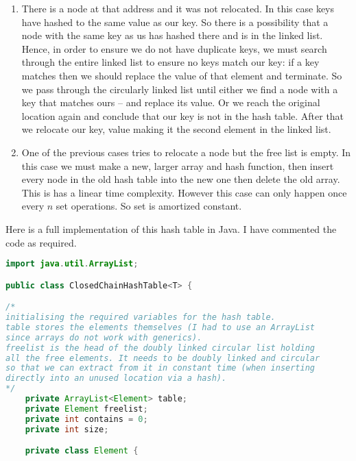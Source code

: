 \documentclass[10pt,\jkfside,a4paper]{article}
\begin{document}
\begin{enumerate}
\begin{enumerate}
\begin{enumerate}[label=(\arabic*)]
\item There is a node at that address and it was not relocated. In this case keys have hashed to the same value as 
our key. So there is a possibility that a node with the same key as us has hashed there and is in the linked list. 
Hence, in order to ensure we do not have duplicate keys, we must search through the entire linked list to ensure no keys match our 
key: if a key matches then we should replace the value of that element and terminate. So we pass through the circularly linked list 
until either we find a node with a key that matches ours -- and replace its value. Or we reach the original location again and 
conclude that our key is not in the hash table. After that we relocate our key, value making it the second element in the linked list.

\item One of the previous cases tries to relocate a node but the free list is empty. In this case we must make a new, larger 
array and hash function, then insert every node in the old hash table into the new one then delete the old array. 
This is has a linear time complexity. However this case can only happen once every $n$ set operations. So set is amortized constant.

\end{enumerate}

\newpage

Here is a full implementation of this hash table in Java. I have commented the code as required.

\begin{lstlisting}[language=java]
import java.util.ArrayList;

public class ClosedChainHashTable<T> {

/*
initialising the required variables for the hash table. 
table stores the elements themselves (I had to use an ArrayList 
since arrays do not work with generics).
freelist is the head of the doubly linked circular list holding 
all the free elements. It needs to be doubly linked and circular 
so that we can extract from it in constant time (when inserting 
directly into an unused location via a hash).
*/
    private ArrayList<Element> table;
    private Element freelist;
    private int contains = 0;
    private int size;

    private class Element {
	

\end{lstlisting}
\end{enumerate}
\end{enumerate}
\end{document}
